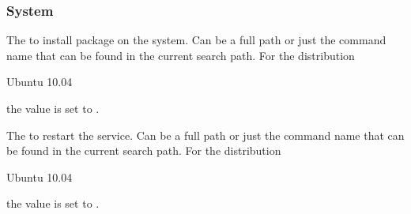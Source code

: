 \subsubsection*{System}


The  to install package on the system. Can be a full path or
just the command name that can be found in the current search path. 
For the distribution
\begin{inparaitem}
\item[\TheDistribution{ubuntu}] Ubuntu 10.04
\end{inparaitem}
the value is set to .


The  to restart the service. Can be a full path or
just the command name that can be found in the current search path. 
For the distribution
\begin{inparaitem}
\item[\TheDistribution{ubuntu}] Ubuntu 10.04
\end{inparaitem}
the value is set to .

